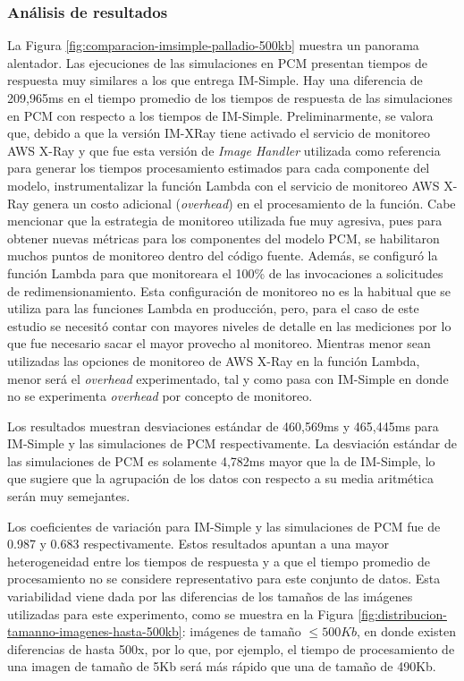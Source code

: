 \subsubsection{Análisis de resultados} 
La Figura \ref{fig:comparacion-imsimple-palladio-500kb} muestra un panorama alentador. Las ejecuciones de las simulaciones en PCM presentan tiempos de respuesta muy similares a los que entrega IM-Simple. Hay una diferencia de 209,965ms en el tiempo promedio de los tiempos de respuesta de las simulaciones en PCM con respecto a los tiempos de IM-Simple. Preliminarmente, se valora que, debido a que la versión IM-XRay tiene activado el servicio de monitoreo AWS X-Ray y que fue esta versión de \emph{Image Handler} utilizada como referencia para generar los tiempos procesamiento estimados para cada componente del modelo, instrumentalizar la función Lambda con el servicio de monitoreo AWS X-Ray genera un costo adicional (\emph{overhead}) en el procesamiento de la función. Cabe mencionar que la estrategia de monitoreo utilizada fue muy agresiva, pues para obtener nuevas métricas para los componentes del modelo PCM, se habilitaron muchos puntos de monitoreo dentro del código fuente. Además, se configuró la función Lambda para que monitoreara el 100\% de las invocaciones a solicitudes de redimensionamiento. Esta configuración de monitoreo no es la habitual que se utiliza para las funciones Lambda en producción, pero, para el caso de este estudio se necesitó contar con mayores niveles de detalle en las mediciones por lo que fue necesario sacar el mayor provecho al monitoreo. Mientras menor sean utilizadas las opciones de monitoreo de AWS X-Ray en la función Lambda, menor será el \emph{overhead} experimentado, tal y como pasa con IM-Simple en donde no se experimenta \emph{overhead} por concepto de monitoreo.

Los resultados muestran desviaciones estándar de 460,569ms y 465,445ms para IM-Simple y las simulaciones de PCM respectivamente. La desviación estándar de las simulaciones de PCM es solamente 4,782ms mayor que la de IM-Simple, lo que sugiere que la agrupación de los datos con respecto a su media aritmética serán muy semejantes.

Los coeficientes de variación para IM-Simple y las simulaciones de PCM fue de 0.987 y 0.683 respectivamente. Estos resultados apuntan a una mayor heterogeneidad entre los tiempos de respuesta y a que el tiempo promedio de procesamiento no se considere representativo para este conjunto de datos. Esta variabilidad viene dada por las diferencias de los tamaños de las imágenes utilizadas para este experimento, como se muestra en la Figura \ref{fig:distribucion-tamanno-imagenes-hasta-500kb}: imágenes de tamaño $\leq 500Kb$, en donde existen diferencias de hasta 500x, por lo que, por ejemplo, el tiempo de procesamiento de una imagen de tamaño de 5Kb será más rápido que una de tamaño de 490Kb.

